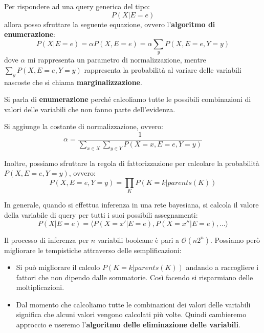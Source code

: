 Per rispondere ad una query generica del tipo:
\begin{equation*}
    P(X|E=e)
\end{equation*}
allora posso sfruttare la seguente equazione, ovvero l'\textbf{algoritmo di
    enumerazione}:
\begin{equation}
    P(X|E = e) = \alpha P(X,E = e) = \alpha \sum_{y} P(X,E = e, Y = y)
\end{equation}
dove $\alpha$ mi rappresenta un parametro di normalizzazione, mentre $\sum_{y}
    P(X,E = e, Y = y)$ rappresenta la probabilità al variare delle variabili nascoste 
che si chiama \textbf{marginalizzazione}.

Si parla di \textbf{enumerazione} perché calcoliamo tutte le possibili combinazioni di valori
delle variabili che non fanno parte dell'evidenza.
\begin{nota}
    Si aggiunge la costante di normalizzazione, ovvero:
    \begin{equation}
        \alpha = \frac{1}{\sum_{x\in X}\sum_{y\in Y}P(X = x, E=e,Y=y)}
    \end{equation}
\end{nota}
Inoltre, possiamo sfruttare la regola di fattorizzazione per calcolare la probabilità
$P(X,E=e,Y=y)$, ovvero:
\begin{equation}
    P(X,E=e,Y=y) = \prod_{K} P(K=k | parents(K))
\end{equation}

In generale, quando si effettua inferenza in una rete bayesiana, si calcola il
valore della variabile di query per tutti i suoi possibili assegnamenti:
\begin{equation*}
    P(X|E=e) = \langle P(X = x'|E = e), P(X = x''|E = e),\dots \rangle
\end{equation*}

Il processo di inferenza per $n$ variabili booleane è pari a $\mathcal{O}(n2^n)$.
Possiamo però migliorare le tempistiche attraverso delle semplificazioni:
\begin{itemize}
    \item Si può migliorare il calcolo $P(K=k | parents(K))$ andando a raccogliere
          i fattori che non dipendo dalle sommatorie. Così facendo si risparmiano
          delle moltiplicazioni.
    \item Dal momento che calcoliamo tutte le combinazioni dei valori delle
          variabili significa che alcuni valori vengono calcolati più volte.
          Quindi cambieremo approccio e useremo l'\textbf{algoritmo delle
              eliminazione delle variabili}.
\end{itemize}

